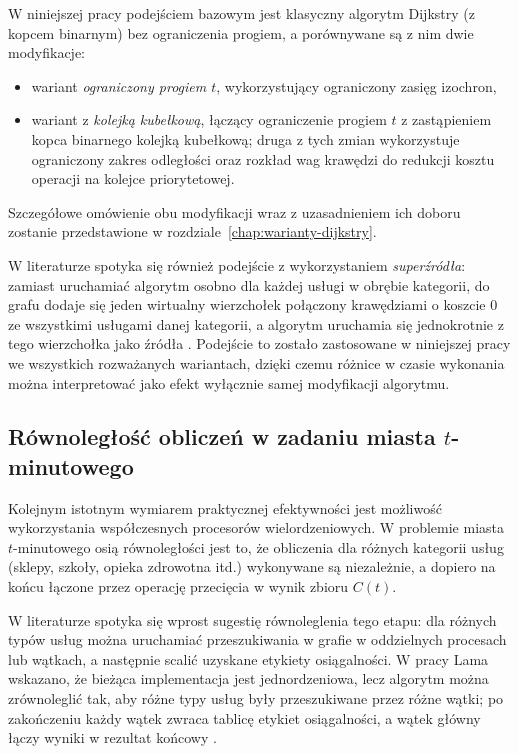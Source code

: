 W niniejszej pracy podejściem bazowym jest klasyczny algorytm Dijkstry (z kopcem binarnym) bez
ograniczenia progiem, a porównywane są z nim dwie modyfikacje:
\begin{itemize}
  \item wariant \emph{ograniczony progiem $t$}, wykorzystujący ograniczony zasięg izochron,
  \item wariant z \emph{kolejką kubełkową}, łączący ograniczenie progiem $t$ z zastąpieniem
        kopca binarnego kolejką kubełkową; druga z tych zmian wykorzystuje ograniczony zakres odległości
        oraz rozkład wag krawędzi do redukcji kosztu operacji na kolejce priorytetowej.
\end{itemize}
Szczegółowe omówienie obu modyfikacji wraz z uzasadnieniem ich doboru zostanie przedstawione
w rozdziale~\ref{chap:warianty-dijkstry}.

W literaturze spotyka się również podejście z wykorzystaniem \emph{superźródła}: zamiast uruchamiać
algorytm osobno dla każdej usługi w obrębie kategorii, do grafu dodaje się jeden wirtualny wierzchołek
połączony krawędziami o koszcie $0$ ze wszystkimi usługami danej kategorii, a algorytm uruchamia się
jednokrotnie z tego wierzchołka jako źródła \cite{Lam2024}. Podejście to zostało zastosowane w niniejszej
pracy we wszystkich rozważanych wariantach, dzięki czemu różnice w czasie wykonania można interpretować
jako efekt wyłącznie samej modyfikacji algorytmu.

\subsection{Równoległość obliczeń w zadaniu miasta $t$-minutowego}
\label{sec:intro:parallel}

Kolejnym istotnym wymiarem praktycznej efektywności jest możliwość wykorzystania współczesnych
procesorów wielordzeniowych. W problemie miasta $t$-minutowego osią równoległości jest to, że
obliczenia dla różnych kategorii usług (sklepy, szkoły, opieka zdrowotna itd.) wykonywane są
niezależnie, a dopiero na końcu łączone przez operację przecięcia w wynik zbioru $C(t)$.

W literaturze spotyka się wprost sugestię równoleglenia tego etapu: dla różnych typów usług
można uruchamiać przeszukiwania w grafie w oddzielnych procesach lub wątkach, a następnie scalić
uzyskane etykiety osiągalności. W pracy Lama wskazano, że bieżąca implementacja jest jednordzeniowa,
lecz algorytm można zrównoleglić tak, aby różne typy usług były przeszukiwane przez różne wątki;
po zakończeniu każdy wątek zwraca tablicę etykiet osiągalności, a wątek główny łączy wyniki
w rezultat końcowy \cite{Lam2024}.

